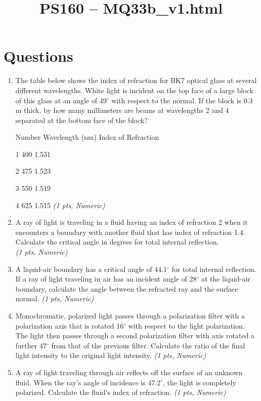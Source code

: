 \documentclass[11pt]{article}
\title{PS160 -- MQ33b\_v1.html}
\date{}
\begin{document}
\maketitle

\section*{Questions}

\begin{enumerate}[leftmargin=*]
  \item The table below shows the index of refraction for BK7 optical glass at several different wavelengths. White light is incident on the top face of a large block of this glass at an angle of 49$^{\circ}$ with respect to the normal. If the block is 0.3 m thick, by how many millimeters are beams at wavelengths 2 and 4 separated at the bottom face of the block?

Number
Wavelength (nm)
Index of Refraction

1
400
1.531

2
475
1.523

3
550
1.519

4
625
1.515 \hfill \textit{(1 pts, Numeric)}

  \item A ray of light is traveling in a fluid having an index of refraction 2 when it encounters a boundary with another fluid that has index of refraction 1.4. Calculate the critical angle in degrees for total internal reflection. \\ \hfill \textit{(1 pts, Numeric)}

  \item A liquid-air boundary has a critical angle of 44.1$^{\circ}$ for total internal reflection. If a ray of light traveling in air has an incident angle of 28$^{\circ}$ at the liquid-air boundary, calculate the angle between the refracted ray and the surface normal. \hfill \textit{(1 pts, Numeric)}

  \item Monochromatic, polarized light passes through a polarization filter with a polarization axis that is rotated 16$^{\circ}$ with respect to the light polarization. The light then passes through a second polarization filter with axis rotated a further 47$^{\circ}$ from that of the previous filter. Calculate the ratio of the final light intensity to the original light intensity. \hfill \textit{(1 pts, Numeric)}

  \item A ray of light traveling through air reflects off the surface of an unknown fluid. When the ray's angle of incidence is 47.2$^{\circ}$, the light is completely polarized. Calculate the fluid's index of refraction. \hfill \textit{(1 pts, Numeric)}

\end{enumerate}
\end{document}
